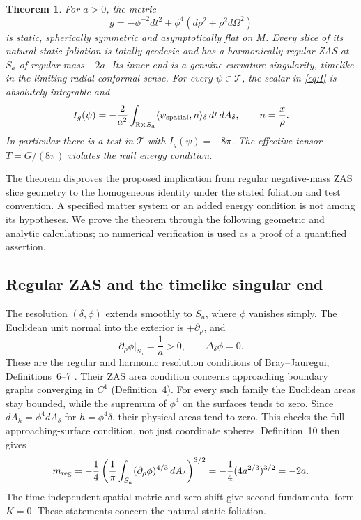\documentclass[11pt]{article}
\newtheorem{theorem}{Theorem}
\newcommand{\dA}{\,dA}
\begin{document}
\begin{theorem}\label{thm:main}
For $a>0$, the metric
\begin{equation}\label{eq:mainmetric}
 g=-\phi^{-2}dt^2+\phi^4(d\rho^2+\rho^2d\Omega^2)
\end{equation}
is static, spherically symmetric and asymptotically flat on $M$. Every slice
of its natural static foliation is totally geodesic and has a harmonically
regular ZAS at $S_a$ of regular mass $-2a$. Its inner end is a genuine
curvature singularity, timelike in the limiting radial conformal sense.
For every $\psi\in\mathcal T$, the scalar in \eqref{eq:I} is absolutely
integrable and
\begin{equation}\label{eq:mainflux}
 I_g(\psi)=-\frac{2}{a^2}
 \int_{\mathbb R\times S_a}
       \langle\psi_{\rm spatial},n\rangle_\delta\,dt\dA_\delta,
 \qquad n=\frac{x}{\rho}.
\end{equation}
In particular there is a test in $\mathcal T$ with $I_g(\psi)=-8\pi$.
The effective tensor $T=G/(8\pi)$ violates the null energy condition.
\end{theorem}

The theorem disproves the proposed implication from regular negative-mass
ZAS slice geometry to the homogeneous identity under the stated foliation
and test convention. A specified matter system or an added energy condition
is not among its hypotheses. We prove the theorem through the following
geometric and analytic calculations; no numerical verification is used as a
proof of a quantified assertion.

\subsection{Regular ZAS and the timelike singular end}

The resolution $(\delta,\phi)$ extends smoothly to $S_a$, where $\phi$ vanishes
simply. The Euclidean unit normal into the exterior is $+\partial_\rho$, and
\[
 \partial_\rho\phi|_{S_a}=\frac1a>0,\qquad \Delta_\delta\phi=0.
\]
These are the regular and harmonic resolution conditions of
Bray--Jauregui, Definitions~6--7 \cite{BJ}. Their ZAS area condition concerns
approaching boundary graphs converging in $C^1$ (Definition~4). For every such
family the Euclidean areas stay bounded, while the supremum of $\phi^4$
on the surfaces tends to zero. Since $dA_h=\phi^4dA_\delta$ for
$h=\phi^4\delta$, their physical areas tend to zero. This checks the full
approaching-surface condition, not just coordinate spheres. Definition~10
then gives
\begin{equation}\label{eq:mass}
 m_{\rm reg}=-\frac14\left(\frac1\pi\int_{S_a}
       (\partial_\rho\phi)^{4/3}\dA_\delta\right)^{3/2}
 =-\frac14(4a^{2/3})^{3/2}=-2a.
\end{equation}
The time-independent spatial metric and zero shift give second fundamental
form $K=0$. These statements concern the natural static foliation.
\end{document}
